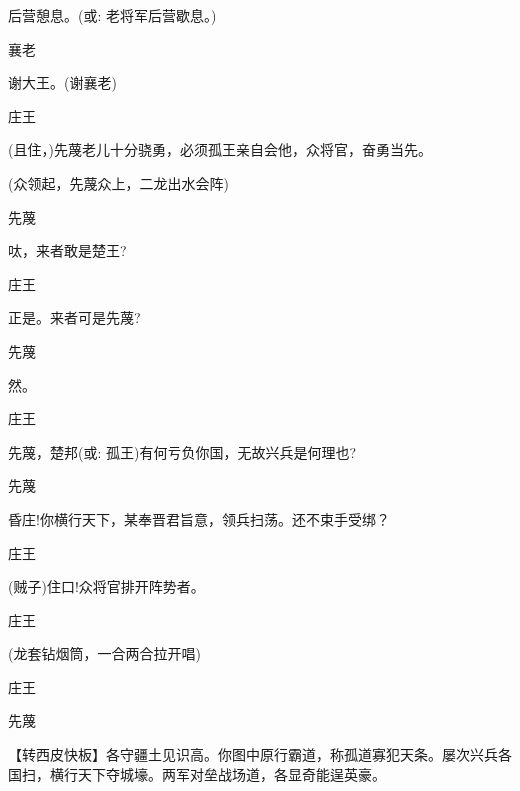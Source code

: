 {后营憩息。({\akai 或}: 老将军后营歇息。)

襄老\hspace{30pt}~

谢大王。(谢襄老)

庄王\hspace{30pt}~

(且住，)先蔑老儿十分骁勇，必须孤王亲自会他，众将官，奋勇当先。

(众领起，先蔑众上，二龙出水会阵)

先蔑\hspace{30pt}~

呔，来者敢是楚王?

庄王\hspace{30pt}~

正是。来者可是先蔑?

先蔑\hspace{30pt}~

然。

庄王\hspace{30pt}~

先蔑，楚邦({\akai 或}: 孤王)有何亏负你国，无故兴兵是何理也?

先蔑\hspace{30pt}~

昏庄!你横行天下，某奉晋君旨意，领兵扫荡。还不束手受绑？

庄王\hspace{30pt}~

(贼子)住口!众将官排开阵势者。

庄王\hspace{30pt}~


(龙套钻烟筒，一合两合拉开唱)

庄王


先蔑


【{\footnotesize 转}{\akai 西皮快板}】各守疆土见识高。你图中原行霸道，称孤道寡犯天条。屡次兴兵各国扫，横行天下夺城壕。两军对垒战场道，各显奇能逞英豪。

}
